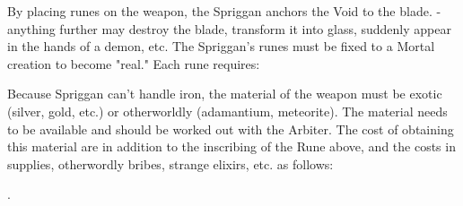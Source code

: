 By placing runes on the weapon, the Spriggan anchors the Void to the blade.  - anything further may destroy the blade, transform it into glass, suddenly appear in the hands of a demon, etc.  The Spriggan's runes must be fixed to a Mortal creation to become "real." Each rune requires:


Because Spriggan can't handle iron, the material of the weapon must be exotic (silver, gold, etc.) or otherworldly (adamantium, meteorite).  The material needs to be available and should be worked out with the Arbiter. The cost of obtaining this material are in addition to the inscribing of the Rune above, and the costs in supplies, otherwordly bribes, strange elixirs, etc. as follows:


.

\newpage

